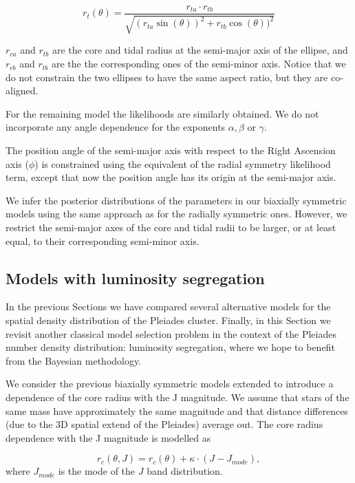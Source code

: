 \begin{equation}
r_t(\theta) = \frac{r_{ta}\cdot r_{tb}}{\sqrt{(r_{ta}\sin(\theta))^2+r_{tb}\cos(\theta))^2}}
\label{eq:anglert}
\end{equation}

$r_{ca}$ and $r_{tb}$ are the core and tidal radius at the semi-major axis of the ellipse, and $r_{cb}$
and $r_{tb}$ are the the corresponding ones of the semi-minor axis. Notice that we do not
constrain the two ellipses to have the same aspect ratio, but they are co-aligned.

For the remaining model the likelihoods are similarly obtained. We
do not incorporate any angle dependence for the exponents $\alpha,\beta$ or $\gamma$.  

The position angle of the semi-major axis with respect to the Right
Ascension axis ($\phi$) is constrained using the equivalent of the
radial symmetry likelihood term, except that now the position angle has
its origin at the semi-major axis.

We infer the posterior distributions of the parameters in our biaxially symmetric models using
the same approach as for the radially symmetric ones. However, we restrict
the semi-major axes of the core and tidal radii to be larger, or at least equal, to their corresponding semi-minor axis.

\subsection{Models with luminosity segregation}
\label{sec:lumin-segreg}
In the previous Sections we have compared several alternative models
for the spatial density distribution of the Pleiades
cluster. Finally, in this Section we revisit another classical model selection problem in the
context of the Pleiades number density distribution: luminosity segregation, where we hope to
benefit from the Bayesian methodology.

We consider the previous biaxially symmetric models extended to introduce
a dependence of the core radius with the J magnitude. We assume that stars of the same
mass have approximately the same magnitude and that distance
differences (due to the 3D spatial extend of the Pleiades) average
out. The core radius dependence with the J magnitude is modelled as

\begin{equation}
\label{eq:rc_segregated}
  r_c(\theta,J) = r_c(\theta)+\kappa\cdot(J- J_{mode}),
\end{equation}
where $J_{mode}$ is the mode of the $J$ band distribution. 

